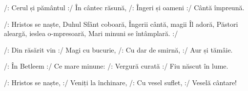 \beginverse
/: Cerul și pământul :/
În cântec răsună,
/: Îngeri și oameni :/
Cântă împreună.
\endverse

\beginchorus
/: Hristos se naște,
Duhul Sfânt coboară,
Îngerii cântă, magii Îl adoră,
Păstori aleargă, ieslea o-mpresoară,
Mari minuni se întâmplară. :/
\endchorus

\beginverse
/: Din răsărit vin :/
Magi cu bucurie,
/: Cu dar de smirnă, :/
Aur și tămâie.
\endverse

\beginverse
/: În Betleem :/
Ce mare minune:
/: Vergură curată :/
Fiu născut în lume.
\endverse

\beginverse
/: Hristos se naște, :/
Veniți la închinare,
/: Cu vesel suflet, :/
Veselă cântare!
\endverse
\endsong